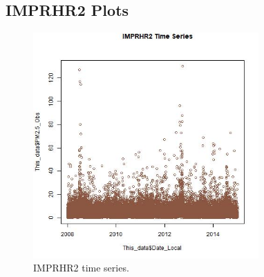 
\subsection{IMPRHR2 Plots}
\begin{figure} 
\centering 
\includegraphics[width=0.77\textwidth]{Code_Outputs/IMPRHR2_time_series.jpg} 
\caption{\label{fig:IMPRHR2TS}IMPRHR2 time series.} 
\end{figure} 
 
